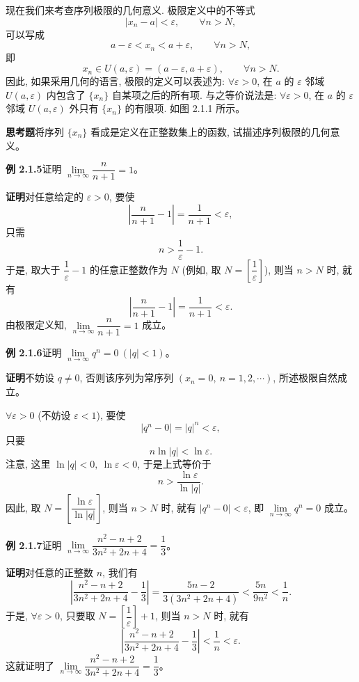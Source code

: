 \documentclass[UTF8, 12pt, fontset=fandol, oneside]{ctexart}
\begin{document}
现在我们来考查序列极限的几何意义. 极限定义中的不等式
\[
  |x_n-a|<\varepsilon,\qquad \forall n>N,
\]
可以写成
\[
  a-\varepsilon<x_n<a+\varepsilon,\qquad \forall n>N,
\]
即
\[
  x_n\in U(a,\varepsilon)=(a-\varepsilon,a+\varepsilon),\qquad \forall n>N.
\]
因此, 如果采用几何的语言, 极限的定义可以表述为: $\forall\varepsilon>0$, 在 $a$ 的 $\varepsilon$ 邻域 $U(a,\varepsilon)$ 内包含了 $\{x_n\}$ 自某项之后的所有项. 与之等价说法是: $\forall\varepsilon>0$, 在 $a$ 的 $\varepsilon$ 邻域 $U(a,\varepsilon)$ 外只有 $\{x_n\}$ 的有限项. 如图 2.1.1 所示。

\noindent\textbf{思考题}\quad 将序列 $\{x_n\}$ 看成是定义在正整数集上的函数, 试描述序列极限的几何意义。

\noindent\textbf{例 2.1.5}\quad 证明 $\lim\limits_{n\to\infty}\dfrac{n}{n+1}=1$。

\noindent\textbf{证明}\quad 对任意给定的 $\varepsilon>0$, 要使
\[
  \left|\frac{n}{n+1}-1\right|
  =
  \frac1{n+1}<\varepsilon,
\]
只需
\[
  n>\frac1\varepsilon-1.
\]
于是, 取大于 $\dfrac1\varepsilon-1$ 的任意正整数作为 $N$ (例如, 取 $N=\left[\dfrac1\varepsilon\right]$), 则当 $n>N$ 时, 就有
\[
  \left|\frac{n}{n+1}-1\right|
  =
  \frac1{n+1}<\varepsilon.
\]
由极限定义知, $\lim\limits_{n\to\infty}\dfrac{n}{n+1}=1$ 成立。

\noindent\textbf{例 2.1.6}\quad 证明 $\lim\limits_{n\to\infty}q^n=0\ (|q|<1)$。

\noindent\textbf{证明}\quad 不妨设 $q\ne0$, 否则该序列为常序列 $(x_n=0,\ n=1,2,\cdots)$, 所述极限自然成立。

$\forall\varepsilon>0$ (不妨设 $\varepsilon<1$), 要使
\[
  |q^n-0|=|q|^n<\varepsilon,
\]
只要
\[
  n\ln |q|<\ln\varepsilon.
\]
注意, 这里 $\ln |q|<0,\ \ln\varepsilon<0$, 于是上式等价于
\[
  n>\frac{\ln\varepsilon}{\ln |q|}.
\]
因此, 取 $N=\left[\dfrac{\ln\varepsilon}{\ln |q|}\right]$, 则当 $n>N$ 时, 就有 $|q^n-0|<\varepsilon$, 即 $\lim\limits_{n\to\infty}q^n=0$ 成立。

\noindent\textbf{例 2.1.7}\quad 证明 $\lim\limits_{n\to\infty}\dfrac{n^2-n+2}{3n^2+2n+4}=\dfrac13$。

\noindent\textbf{证明}\quad 对任意的正整数 $n$, 我们有
\[
  \left|\frac{n^2-n+2}{3n^2+2n+4}-\frac13\right|
  =
  \frac{5n-2}{3(3n^2+2n+4)}
  <
  \frac{5n}{9n^2}
  <
  \frac1n.
\]
于是, $\forall\varepsilon>0$, 只要取 $N=\left[\dfrac1\varepsilon\right]+1$, 则当 $n>N$ 时, 就有
\[
  \left|\frac{n^2-n+2}{3n^2+2n+4}-\frac13\right|
  <
  \frac1n<\varepsilon.
\]
这就证明了 $\lim\limits_{n\to\infty}\dfrac{n^2-n+2}{3n^2+2n+4}=\dfrac13$。
\end{document}
